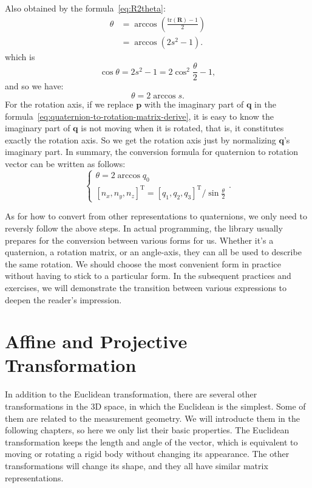 Also obtained by the formula~\eqref{eq:R2theta}:
\begin{equation}
	\begin{aligned}
		\theta &= \arccos(\frac{\mathrm{tr}(\mathbf{R})-1}{2}) \\
		&=\arccos(2s^2-1).
	\end{aligned}
\end{equation}
which is
\begin{equation}
	\cos \theta =2s^2-1=2 \cos^2 \frac{\theta}{2} -1,
\end{equation}
and so we have:
\begin{equation}
	\theta = 2 \arccos s.
\end{equation}
For the rotation axis, if we replace $\mathbf{p}$ with the imaginary part of $\mathbf{q}$ in the formula~\eqref{eq:quaternion-to-rotation-matrix-derive}, it is easy to know the imaginary part of  $\mathbf{q}$ is not moving when it is rotated, that is, it constitutes exactly the rotation axis. So we get the rotation axis just by normalizing $\mathbf{q}$'s imaginary part. In summary, the conversion formula for quaternion to rotation vector can be written as follows:
\begin{equation}
	\label{eq:rotationVector2Quaternion}
	\begin{cases}
		\theta = 2\arccos {q_0}\\
		{\left[ {{n_x},{n_y},{n_z}} \right]^\mathrm{T}} = {{{\left[ {{q_1},{q_2},{q_3}} \right] }^\mathrm{T}}}/{\sin \frac{\theta }{2}}
	\end{cases} .
\end{equation}

As for how to convert from other representations to quaternions, we only need to reversly follow the above steps. In actual programming, the library usually prepares for the conversion between various forms for us. Whether it's a quaternion, a rotation matrix, or an angle-axis, they can all be used to describe the same rotation. We should choose the most convenient form in practice without having to stick to a particular form. In the subsequent practices and exercises, we will demonstrate the transition between various expressions to deepen the reader's impression.

\section{Affine and Projective Transformation}
In addition to the Euclidean transformation, there are several other transformations in the 3D space, in which the Euclidean is the simplest. Some of them are related to the measurement geometry. We will introducte them in the following chapters, so here we only list their basic properties. The Euclidean transformation keeps the length and angle of the vector, which is equivalent to moving or rotating a rigid body without changing its appearance. The other transformations will change its shape, and they all have similar matrix representations.

